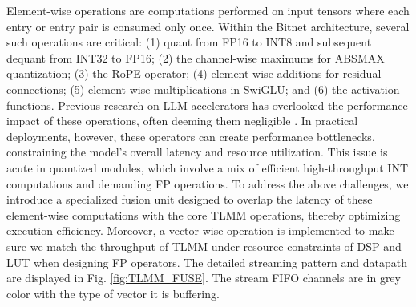 \documentclass[sigconf]{acmart}
\begin{document}
Element-wise operations are computations performed on input tensors where each entry or entry pair is consumed only once. Within the Bitnet architecture, several such operations are critical: (1) quant from FP16 to INT8 and subsequent dequant from INT32 to FP16; (2) the channel-wise maximums for ABSMAX quantization; (3) the RoPE operator; (4) element-wise additions for residual connections; (5) element-wise multiplications in SwiGLU; and (6) the activation functions.
Previous research on LLM accelerators has overlooked the performance impact of these operations, often deeming them negligible \cite{moitra2025meadow}. In practical deployments, however, these operators can create performance bottlenecks, constraining the model's overall latency and resource utilization. This issue is acute in quantized modules, which involve a mix of efficient high-throughput INT computations and demanding FP operations. 
To address the above challenges, we introduce a specialized fusion unit designed to overlap the latency of these element-wise computations with the core TLMM operations, thereby optimizing execution efficiency. Moreover, a vector-wise operation is implemented to make sure we match the throughput of TLMM under resource constraints of DSP and LUT when designing FP operators. The detailed streaming pattern and datapath are displayed in Fig. \ref{fig:TLMM_FUSE}. The stream FIFO channels are in grey color with the type of vector it is buffering.
\end{document}

